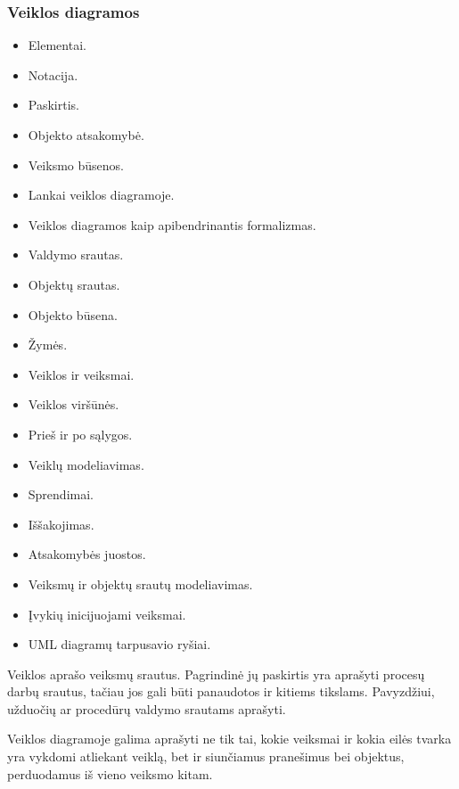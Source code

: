 

\subsubsection{Veiklos diagramos}

\begin{itemize}
  \item Elementai.
  \item Notacija.
  \item Paskirtis.
  \item Objekto atsakomybė.
  \item Veiksmo būsenos.
  \item Lankai veiklos diagramoje.
  \item Veiklos diagramos kaip apibendrinantis formalizmas.
  \item Valdymo srautas.
  \item Objektų srautas.
  \item Objekto būsena.
  \item Žymės.
  \item Veiklos ir veiksmai.
  \item Veiklos viršūnės.
  \item Prieš ir po sąlygos.
  \item Veiklų modeliavimas.
  \item Sprendimai.
  \item Iššakojimas.
  \item Atsakomybės juostos.
  \item Veiksmų ir objektų srautų modeliavimas.
  \item Įvykių inicijuojami veiksmai.
  \item UML diagramų tarpusavio ryšiai.
\end{itemize}

Veiklos aprašo veiksmų srautus. Pagrindinė jų paskirtis yra aprašyti
procesų darbų srautus, tačiau jos gali būti panaudotos ir kitiems tikslams.
Pavyzdžiui, užduočių ar procedūrų valdymo srautams aprašyti.

\begin{note}
  Veiklos diagramoje galima aprašyti ne tik tai, kokie veiksmai ir kokia
  eilės tvarka yra vykdomi atliekant veiklą, bet ir siunčiamus pranešimus
  bei objektus, perduodamus iš vieno veiksmo kitam.
\end{note}

